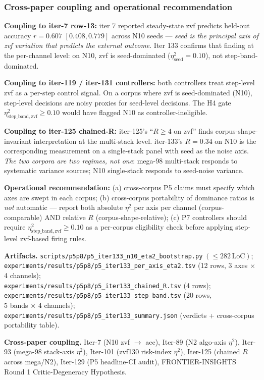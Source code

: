 \subsubsection{Cross-paper coupling and operational recommendation}
\label{sec:p5-iter133-coupling}

\textbf{Coupling to iter-7 row-13:} iter 7 reported steady-state zvf predicts
held-out accuracy $r=0.607$ $[0.408, 0.779]$ across N10 seeds --- \emph{seed
is the principal axis of zvf variation that predicts the external outcome}.
Iter 133 confirms that finding at the per-channel level: on N10, zvf is
seed-dominated ($\eta^2_{\mathrm{seed}}=0.10$), not step-band-dominated.

\textbf{Coupling to iter-119 / iter-131 controllers:} both controllers treat
step-level zvf as a per-step control signal. On a corpus where zvf is
seed-dominated (N10), step-level decisions are noisy proxies for
seed-level decisions. The H4 gate
$\eta^2_{\mathrm{step\_band}, \mathrm{zvf}} \geq 0.10$ would have flagged
N10 as controller-ineligible.

\textbf{Coupling to iter-125 chained-R:} iter-125's ``$R \geq 4$ on zvf''
finds corpus-shape-invariant interpretation at the multi-stack level.
iter-133's $R=0.34$ on N10 is the corresponding measurement on a
single-stack panel with seed as the noise axis. \emph{The two corpora
are two regimes, not one}: mega-98 multi-stack responds to systematic
variance sources; N10 single-stack responds to seed-noise variance.

\textbf{Operational recommendation:} (a) cross-corpus P5 claims must
specify which axes are swept in each corpus; (b) cross-corpus portability
of dominance ratios is \emph{not} automatic --- report both absolute
$\eta^2$ per axis per channel (corpus-comparable) AND relative $R$
(corpus-shape-relative); (c) P7 controllers should require
$\eta^2_{\mathrm{step\_band}, \mathrm{zvf}} \geq 0.10$ as a per-corpus
eligibility check before applying step-level zvf-based firing rules.

\noindent\textbf{Artifacts.}\;
\texttt{scripts/p5p8/p5\_iter133\_n10\_eta2\_bootstrap.py}$\;(\leq\!282\,\mathrm{LoC})$;\\
\texttt{experiments/results/p5p8/p5\_iter133\_per\_axis\_eta2.tsv}
(12 rows, 3 axes $\times$ 4 channels);\\
\texttt{experiments/results/p5p8/p5\_iter133\_chained\_R.tsv} (4 rows);\\
\texttt{experiments/results/p5p8/p5\_iter133\_step\_band.tsv} (20 rows,\\
5 bands $\times$ 4 channels);\\
\texttt{experiments/results/p5p8/p5\_iter133\_summary.json}
(verdicts + cross-corpus portability table).

\noindent\textbf{Cross-paper coupling.}\; Iter-7 (N10 zvf $\to$ acc),
Iter-89 (N2 algo-axis $\eta^2$), Iter-93 (mega-98 stack-axis $\eta^2$),
Iter-101 (zvf130 risk-index $\eta^2$), Iter-125 (chained $R$ across
mega/N2), Iter-129 (P5 headline-CI audit), FRONTIER-INSIGHTS
Round 1 Critic-Degeneracy Hypothesis.

